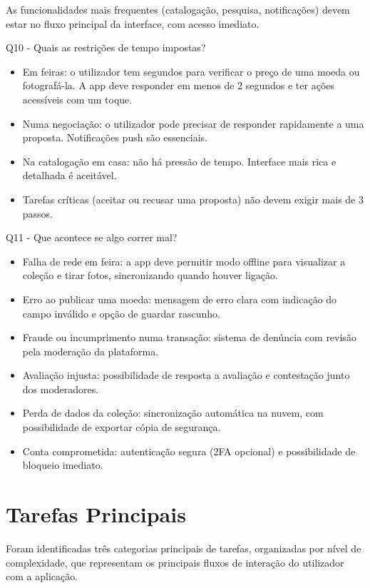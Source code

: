 \documentclass[12pt,a4paper]{article}
\begin{document}
As funcionalidades mais frequentes (catalogação, pesquisa, notificações) devem estar no fluxo principal da interface, com acesso imediato.

Q10 - Quais as restrições de tempo impostas?

\begin{itemize}
\setlength{\itemsep}{0.15em}
\item Em feiras: o utilizador tem segundos para verificar o preço de uma moeda ou fotografá-la. A app deve responder em menos de 2 segundos e ter ações acessíveis com um toque.
\item Numa negociação: o utilizador pode precisar de responder rapidamente a uma proposta. Notificações push são essenciais.
\item Na catalogação em casa: não há pressão de tempo. Interface mais rica e detalhada é aceitável.
\item Tarefas críticas (aceitar ou recusar uma proposta) não devem exigir mais de 3 passos.
\end{itemize}

Q11 - Que acontece se algo correr mal?

\begin{itemize}
\setlength{\itemsep}{0.15em}
\item Falha de rede em feira: a app deve permitir modo offline para visualizar a coleção e tirar fotos, sincronizando quando houver ligação.
\item Erro ao publicar uma moeda: mensagem de erro clara com indicação do campo inválido e opção de guardar rascunho.
\item Fraude ou incumprimento numa transação: sistema de denúncia com revisão pela moderação da plataforma.
\item Avaliação injusta: possibilidade de resposta a avaliação e contestação junto dos moderadores.
\item Perda de dados da coleção: sincronização automática na nuvem, com possibilidade de exportar cópia de segurança.
\item Conta comprometida: autenticação segura (2FA opcional) e possibilidade de bloqueio imediato.
\end{itemize}

\section{Tarefas Principais}

Foram identificadas três categorias principais de tarefas, organizadas por nível de complexidade, que representam os principais fluxos de interação do utilizador com a aplicação.
\end{document}
